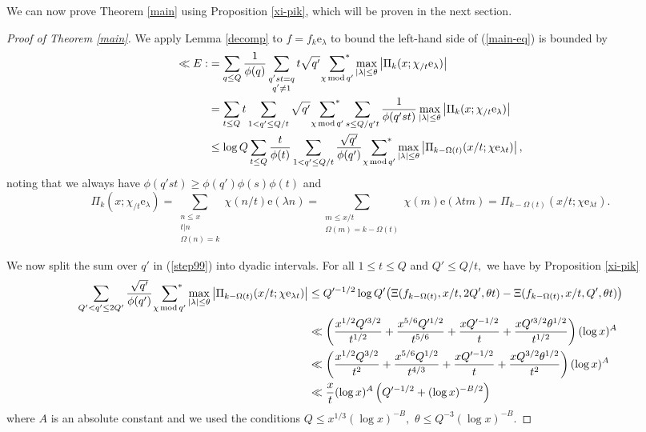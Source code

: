 \documentclass{article}
\newcommand{\Mod}{\,\mathrm{mod}\,}
\newcommand{\e}{\mathrm{e}}
\newcommand{\starsum}{\ \sideset{}{^*}\sum}
\begin{document}
We can now prove Theorem \ref{main} using Proposition \ref{xi-pik}, which will be proven in the next section.
\begin{proof}[Proof of Theorem \ref{main}]
    We apply Lemma \ref{decomp} to $f = f_k\e_\lambda$ to bound the left-hand side of (\ref{main-eq}) is bounded by
    \begin{align}
        \ll E :&= \sum_{q\le Q} \frac{1}{\phi(q)} \sum_{\substack{q'st = q \\ q'\ne 1}} t\sqrt{q'}\starsum_{\chi\Mod q'} \max_{|\lambda|\le \theta} \left|\Pi_k(x; \chi_{/t}\e_{\lambda})\right| \notag
        \\&= \sum_{t\le Q} t \sum_{1 < q'\le Q/t} \sqrt{q'} \starsum_{\chi\Mod q'}  \sum_{s\le Q/q't} \frac{1}{\phi(q'st)} \max_{|\lambda|\le \theta} \left|\Pi_k(x; \chi_{/t}\e_{\lambda})\right| \notag
        \\&\le \log Q \sum_{t\le Q} \frac{t}{\phi(t)} \sum_{1 < q'\le Q/t} \frac{\sqrt{q'}}{\phi(q')} \starsum_{\chi\Mod q'}  \max_{|\lambda|\le \theta} \left|\Pi_{k-\Omega(t)}(x/t; \chi\e_{\lambda t})\right|, \label{step99}
    \end{align}
    noting that we always have $\phi(q'st) \ge \phi(q')\phi(s)\phi(t)$ and $$\Pi_k(x; \chi_{/t}\e_\lambda) = \sum_{\substack{n \le x \\t|n \\ \Omega(n) = k}} \chi(n/t) \e(\lambda n) = \sum_{\substack{m\le x/t \\ \Omega(m) = k - \Omega(t)}} \chi(m) \e(\lambda tm) = \Pi_{k-\Omega(t)}(x/t;\chi\e_{\lambda t}).$$

    We now split the sum over $q'$ in (\ref{step99}) into dyadic intervals. For all $1\le t\le Q$ and $Q' \le Q/t,$ we have by Proposition \ref{xi-pik}
    \begin{align}
        \sum_{Q' < q'\le 2Q'} \frac{\sqrt{q'}}{\phi(q')} \starsum_{\chi\Mod q'} \max_{|\lambda|\le \theta} \left|\Pi_{k-\Omega(t)}(x/t; \chi\e_{\lambda t})\right| &\le Q'^{-1/2} \log Q' \big(\Xi(f_{k-\Omega(t)}, x/t,2Q', \theta t) - \Xi(f_{k-\Omega(t)}, x/t,Q', \theta t)\big) \notag\\&\ll \left(\frac{x^{1/2}Q'^{3/2}}{t^{1/2}} + \frac{x^{5/6}Q'^{1/2}}{t^{5/6}} + \frac{xQ'^{-1/2}}{t} + \frac{xQ'^{3/2}\theta^{1/2}}{t^{1/2}}\right) (\log x)^A \notag 
        \\&\ll \left(\frac{x^{1/2}Q^{3/2}}{t^{2}} + \frac{x^{5/6}Q^{1/2}}{t^{4/3}} + \frac{xQ'^{-1/2}}{t} + \frac{xQ^{3/2}\theta^{1/2}}{t^{2}}\right) (\log x)^A \notag
        \\&\ll \frac{x}{t} (\log x)^A \left(Q'^{-1/2} + (\log x)^{-B/2}\right)
        \label{step100}
    \end{align} 
    where $A$ is an absolute constant and we used the conditions $Q \le x^{1/3}(\log x)^{-B},$ $\theta \le Q^{-3}(\log x)^{-B}.$


\end{proof}
\end{document}
